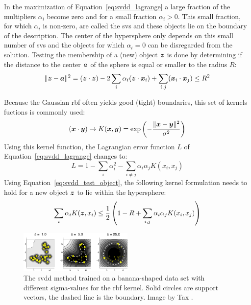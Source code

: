 In the maximization of Equation~\ref{eq:svdd_lagrange} a large fraction of the multipliers $\alpha_i$ become zero and for a small fraction $\alpha_i > 0$.
This small fraction, for which $\alpha_i$ is non-zero, are called the \glspl{sv} and these objects lie on the boundary of the description.
The center of the hypersphere only depends on this small number of \glspl{sv} and the objects for which $\alpha_i = 0$ can be disregarded from the solution.
Testing the membership of a (new) object $\vectorsym{z}$ is done by determining if the distance to the center $\vectorsym{a}$ of the sphere is equal or smaller to the radius $R$:
\begin{equation}\label{eq:svdd_test_object}
  \lVert \vectorsym{z} - \vectorsym{a} \rVert ^2 = (\vectorsym{z} \cdot \vectorsym{z}) - 2 \sum_{i} \alpha_i(\vectorsym{z} \cdot \vectorsym{x}_i) + \sum_{i,j}(\vectorsym{x}_i \cdot \vectorsym{x}_j) \le R^2
\end{equation}


Because the Gaussian \gls{rbf} often yields good (\ie tight) boundaries, this set of kernels fuctions is commonly used:
\begin{equation}
  (\vectorsym{x} \cdot \vectorsym{y}) \rightarrow K(\vectorsym{x},\vectorsym{y}) = \operatorname{exp}\left(- \frac{\lVert \vectorsym{x} - \vectorsym{y} \rVert ^2}{\sigma^2}\right)
\end{equation}
Using this kernel function, the Lagrangian error function $L$ of Equation~\ref{eq:svdd_lagrange} changes to:
\begin{equation}\label{eq:svdd_lagrange_kernel}
  L = 1 - \sum_{i} \alpha_i^2 - \sum_{i \ne j} \alpha_i \alpha_j K(x_i, x_j)
\end{equation}
Using Equation~\ref{eq:svdd_test_object}, the following kernel formulation needs to hold for a new object $\vectorsym{z}$ to lie within the hypersphere:
\begin{equation}\label{eq:svdd_inequality}
  \sum_{i} \alpha_i K(\vectorsym{z}, x_i) \le \frac{1}{2} \left( 1 - R + \sum_{i,j} \alpha_i \alpha_j K(x_i, x_j) \right)
\end{equation}

\begin{figure}
  \centering
    \includegraphics[width=0.5\textwidth,keepaspectratio]{./Figures/chapter3/svdd-boundary.pdf}
  \caption[\gls{svdd} boundary]{The \gls{svdd} method trained on a banana-shaped data set with different sigma-values for the \gls{rbf} kernel. Solid circles are support vectors, the dashed line is the boundary. Image by Tax \cite{tax2001one}.}
  \label{fig:svdd-boundary}
\end{figure}

